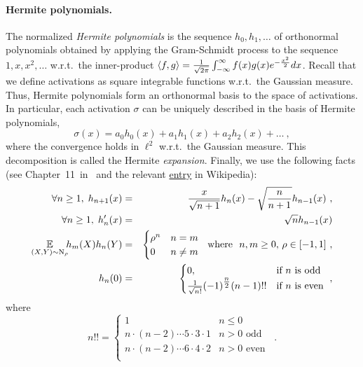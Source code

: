 \paragraph{Hermite polynomials.} The normalized {\em Hermite polynomials} is
the sequence $h_0,h_1,\ldots$ of orthonormal polynomials obtained by
applying the Gram-Schmidt process to the sequence $1,x,x^2,\ldots$ w.r.t.\ the
inner-product 
$\langle f,g \rangle=\frac{1}{\sqrt{2\pi}}\int_{-\infty}^\infty
f(x)g(x)e^{-\frac{x^2}{2}}dx$.
Recall that we define activations as square integrable functions w.r.t.\
the Gaussian measure. Thus, Hermite polynomials form an orthonormal
basis to the space of activations. In particular, each activation $\sigma$
can be uniquely described in the basis of Hermite polynomials,
\begin{equation}\label{eq:hermite_expansion}
\sigma(x) = a_0h_0(x)+a_1h_1(x)+a_2h_2(x)+\ldots ~,
\end{equation}
where the convergence holds in $\ell^2$ w.r.t.\ the Gaussian measure. This
decomposition is called the Hermite {\em expansion}. Finally, we use
the following facts (see Chapter~11~in~\cite{o2014analysis} and the relevant 
\href{https://en.wikipedia.org/wiki/Hermite_polynomials}{entry} in Wikipedia):
\begin{eqnarray}
\forall n\ge 1,\;h_{n+1}(x) & =&
  \frac{x}{\sqrt{n+1}}h_n(x) - \sqrt{\frac{n}{n+1}} h_{n-1}(x) ~,
  \label{eq:hermite_recursion} \\
\forall n\ge 1,\;h'_{n}(x) & = & \sqrt{n}h_{n-1}(x)
  \label{eq:hermite_diff} \\
  \operatorname*{\mathbb{E}}_{(X,Y) \sim \text{N}_\rho} \hspace{-4pt} h_m(X)h_n(Y)
  & = & \begin{cases} \rho^n & n=m\\ 0 & n\ne m\end{cases}
    ~\mbox{ where }~n,m\ge 0, \, \rho\in[-1,1] ~ ,
  \label{eq:hermite_ort} \\
h_n(0) & = &
\begin{cases}
  0,  & \mbox{if }n\mbox{ is odd} \\
  \frac{1}{\sqrt{n!}}(-1)^{\tfrac{n}{2}} (n-1)!! & \mbox{if }n\mbox{ is even}
\end{cases}
~,  \label{eq:hermite_zero_val}
\end{eqnarray}
where
$$
n!! =
\begin{cases}
	1 & n \le  0 \\
	n \cdot (n-2) \cdots 5 \cdot 3 \cdot 1 & n>0 \mbox{ odd }\\
	n \cdot (n-2) \cdots 6 \cdot 4 \cdot 2 & n>0 \mbox{ even }\\
\end{cases}
\,.
$$

